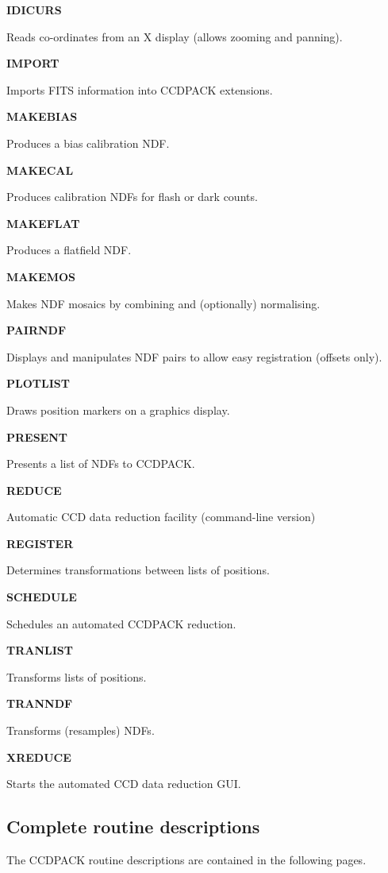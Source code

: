 \documentclass[twoside,11pt]{article}
\newenvironment{latexonly}{}{}
\renewcommand{\_}{\texttt{\symbol{95}}}
\newcommand{\quickdes}[3]{
                         \parbox{1.1in}{\bf #1}
                         \parbox{4.4in}{\raggedright #2 \dotfill}
                         \parbox{0.6in}{\pageref{#3}}
                         \vspace*{0.2in}}
\begin{document}
\begin{latexonly}
\quickdes{IDICURS}{Reads co-ordinates from an X display (allows
                   zooming and panning).}{IDICURS}

\quickdes{IMPORT}{Imports FITS information into CCDPACK extensions.}{IMPORT}

\quickdes{MAKEBIAS}{Produces a bias calibration NDF.}{MAKEBIAS}

\newpage

\quickdes{MAKECAL}{Produces calibration NDFs for flash or dark counts.}
                  {MAKECAL}

\quickdes{MAKEFLAT}{Produces a flatfield NDF.}
                   {MAKEFLAT}

\quickdes{MAKEMOS}{Makes NDF mosaics by combining and (optionally) normalising.}
                  {MAKEMOS}

\quickdes{PAIRNDF}{Displays and manipulates NDF pairs to allow easy
                   registration (offsets only).}
                  {PAIRNDF}

\quickdes{PLOTLIST}{Draws position markers on a graphics display.}
                   {PLOTLIST}

\quickdes{PRESENT}{Presents a list of NDFs to CCDPACK.}{PRESENT}

\quickdes{REDUCE}{Automatic CCD data reduction facility (command-line version)}
                 {REDUCE}

\quickdes{REGISTER}{Determines transformations between lists of positions.}
                   {REGISTER}

\quickdes{SCHEDULE}{Schedules an automated CCDPACK reduction.}{SCHEDULE}

\quickdes{TRANLIST}{Transforms lists of positions.}
                   {TRANLIST}

\quickdes{TRANNDF}{Transforms (resamples) NDFs.} {TRANNDF}

\quickdes{XREDUCE}{Starts the automated CCD data reduction GUI.}{XREDUCE}
\end{latexonly}

\subsection{Complete routine descriptions \label{descriptions}}

The CCDPACK routine descriptions are contained in the following pages.
\newpage
\end{document}
